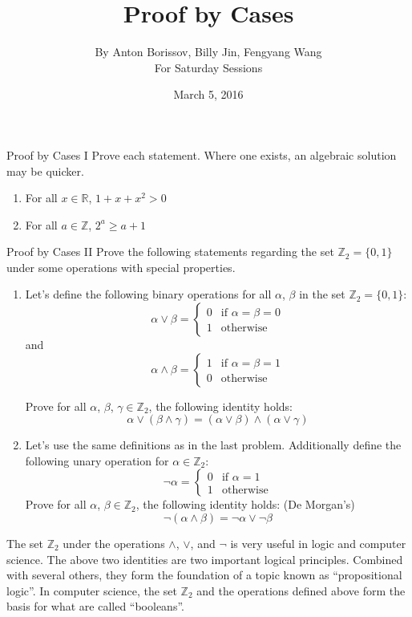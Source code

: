 \documentclass[12pt,letterpaper]{article}
\title{Proof by Cases}
\author{By Anton Borissov, Billy Jin, Fengyang Wang\\
For Saturday Sessions}
\date{March 5, 2016}
\begin{document}
\maketitle

\thispagestyle{empty}

\begin{problem}{Proof by Cases I}
 Prove each statement. Where one exists, an algebraic solution may be quicker.

 \begin{enumerate}[\hspace{.5cm}a.]
  \item For all $x\in\mathbb{R}$, $1 + x + x^2 > 0$
  \item For all $a\in\mathbb{Z}$, $2^a \ge a + 1$
 \end{enumerate}
\end{problem}

\begin{problem}{Proof by Cases II}
 Prove the following statements regarding the set $\mathbb{Z}_2=\{0, 1\}$ under
 some operations with special properties.

 \begin{enumerate}[\hspace{.5cm}a.]
  \item Let's define the following binary operations for all $\alpha$, $\beta$
  in the set $\mathbb{Z}_2=\{0, 1\}$: \[
    \alpha \lor \beta = \begin{cases}
     0 & \text{if }\alpha=\beta=0 \\
     1 & \text{otherwise}
    \end{cases}
   \] and \[
    \alpha \land \beta = \begin{cases}
     1 & \text{if }\alpha=\beta=1 \\
     0 & \text{otherwise}
    \end{cases}
   \]

   Prove for all $\alpha$, $\beta$, $\gamma\in\mathbb{Z}_2$, the following
   identity holds: \[
    \alpha \lor \left(\beta \land \gamma\right) = \left( \alpha \lor \beta
    \right) \land \left( \alpha \lor \gamma \right)
   \]
  \item Let's use the same definitions as in the last problem. Additionally
  define the following unary operation for $\alpha\in\mathbb{Z}_2$: \[
   \lnot\alpha = \begin{cases}
    0 & \text{if }\alpha=1 \\
    1 & \text{otherwise}
   \end{cases}
  \]
  Prove for all $\alpha$, $\beta\in\mathbb{Z}_2$, the following
  identity holds: \hfill (De Morgan's) \[
   \lnot \left(\alpha \land \beta\right) = \lnot\alpha \lor \lnot\beta
  \]
 \end{enumerate}

 The set $\mathbb{Z}_2$ under the operations $\land$, $\lor$, and $\lnot$ is
 very useful in logic and computer science. The above two identities are two
 important logical principles. Combined with several others, they form the
 foundation of a topic known as ``propositional logic''. In computer science,
 the set $\mathbb{Z}_2$ and the operations defined above form the basis for what
 are called ``booleans''.
\end{problem}
\end{document}
